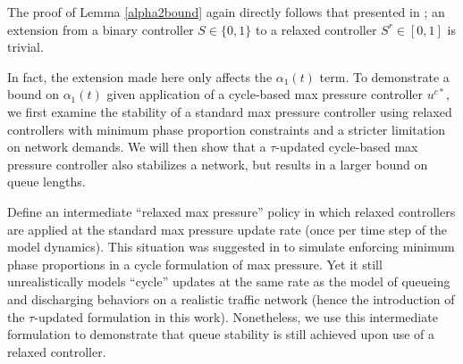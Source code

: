 The proof of Lemma \ref{alpha2bound} again directly follows that presented in \cite{Varaiya2013}; an extension from a binary controller $S\in \{0,1\}$ to a relaxed controller $S^r\in [0,1]$ is trivial. 

In fact, the extension made here only affects the $\alpha_1 (t)$ term. To demonstrate a bound on $\alpha_1(t)$ given application of a cycle-based max pressure controller $u^{c*}$, we first examine the stability of a standard max pressure controller using relaxed controllers with minimum phase proportion constraints and a stricter limitation on network demands. We will then show that a $\tau$-updated cycle-based max pressure controller also stabilizes a network, but results in a larger bound on queue lengths. 

Define an intermediate ``relaxed max pressure'' policy in which relaxed controllers are applied at the standard max pressure update rate (once per time step of the model dynamics). 
This situation was suggested in \cite{Varaiya2013} to simulate enforcing minimum phase proportions in a cycle formulation of max pressure. Yet it still unrealistically models ``cycle'' updates at the same rate as the model of queueing and discharging behaviors on a realistic traffic network (hence the introduction of the $\tau$-updated formulation in this work). Nonetheless, we use this intermediate formulation to demonstrate that queue stability is still achieved upon use of a relaxed controller. 

